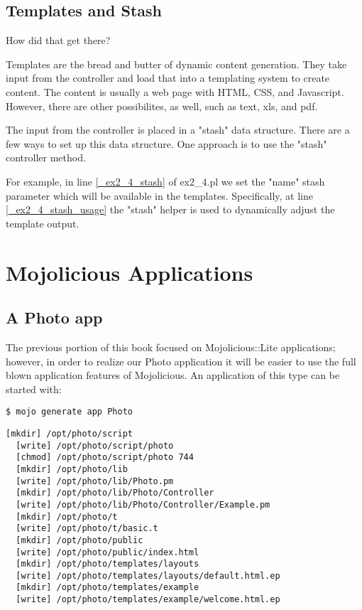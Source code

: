 \documentclass[14pt]{extreport}
\newcommand\Small{\fontsize{12}{13.0}\fontencoding{T1}\selectfont}
\newcommand*\LSTfont{\Small\ttfamily\SetTracking{encoding=*}{-60}\lsstyle}
\begin{document}
\section{Templates and Stash}

{\Large How did that get there?}

Templates are the bread and butter of dynamic content generation.  They take
input from the controller and load that into a templating system to create
content.  The content is usually a web page with HTML, CSS, and Javascript.
However, there are other possibilites, as well, such as text, xls, and pdf.

The input from the controller is placed in a "stash" data structure.  There are
a few ways to set up this data structure.  One approach is to use the "stash"
controller method.



For example, in line \ref{_ex2_4_stash} of ex2\_4.pl we set the "name" stash 
parameter which will be available in the templates.  Specifically, at line 
\ref{_ex2_4_stash_usage} the "stash" helper is used to dynamically adjust
the template output.

\chapter*{Mojolicious Applications}

\section{A Photo app}

The previous portion of this book focused on Mojolicious::Lite applications;
however, in order to realize our Photo application it will be easier to use the
full blown application features of Mojolicious.  An application of this type
can be started with:

\begin{lstlisting}[style=BashInputStyle]
$ mojo generate app Photo           
\end{lstlisting}

\begin{lstlisting}[style=BashOutputStyle]
  [mkdir] /opt/photo/script
  [write] /opt/photo/script/photo
  [chmod] /opt/photo/script/photo 744
  [mkdir] /opt/photo/lib
  [write] /opt/photo/lib/Photo.pm
  [mkdir] /opt/photo/lib/Photo/Controller
  [write] /opt/photo/lib/Photo/Controller/Example.pm
  [mkdir] /opt/photo/t
  [write] /opt/photo/t/basic.t
  [mkdir] /opt/photo/public
  [write] /opt/photo/public/index.html
  [mkdir] /opt/photo/templates/layouts
  [write] /opt/photo/templates/layouts/default.html.ep
  [mkdir] /opt/photo/templates/example
  [write] /opt/photo/templates/example/welcome.html.ep
\end{lstlisting}
\end{document}
